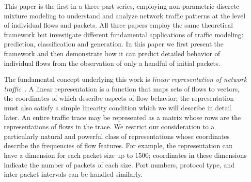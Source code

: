 \documentclass[conference]{IEEEtran}
\title{\vspace{-0.25em}\thetitle}
\author{
{\large{Stefan~Karpinski, John~R.~Gilbert, Elizabeth~M.~Belding}} \vspace{0.25em}\\
Department of Computer Science \\
University of California, Santa Barbara \vspace{0.35em}\\
\textit{\{sgk,gilbert,ebelding\}@cs.ucsb.edu}
}
\begin{document}
\maketitle


This paper is the first in a three-part series, employing non-parametric discrete mixture modeling to understand and analyze network traffic patterns at the level of individual flows and packets.\flownote
All three papers employ the same theoretical framework but investigate different fundamental applications of traffic modeling:
prediction, classification and generation.
In this paper we first present the framework and then demonstrate how it can predict detailed behavior of individual flows from the observation of only a handful of initial packets.

The fundamental concept underlying this work is \emph{linear representation of network traffic}~\cite{Karpinski08}.
A linear representation is a function that maps sets of flows to vectors, the coordinates of which describe aspects of flow behavior;
the representation must also satisfy a simple linearity condition which we will describe in detail later.
An entire traffic trace may be represented as a matrix whose rows are the representations of flows in the trace.
We restrict our consideration to a particularly natural and powerful class of representations whose coordinates describe the frequencies of flow features.
For example, the representation can have a dimension for each packet size up to 1500; coordinates in these dimensions indicate the number of packets of each size.
Port numbers,  protocol type, and inter-packet intervals can be handled similarly.
\end{document}
